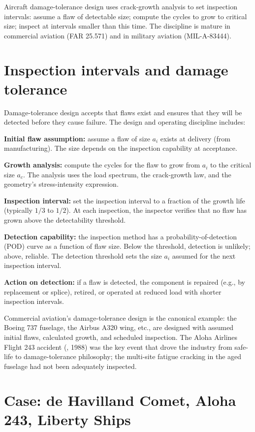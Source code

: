 Aircraft damage-tolerance design uses crack-growth analysis to set inspection intervals: assume a flaw of detectable size; compute the cycles to grow to critical size; inspect at intervals smaller than this time. The discipline is mature in commercial aviation (FAR 25.571) and in military aviation (MIL-A-83444).

\section{Inspection intervals and damage tolerance}

Damage-tolerance design accepts that flaws exist and ensures that they will be detected before they cause failure. The design and operating discipline includes:

\textbf{Initial flaw assumption:} assume a flaw of size $a_i$ exists at delivery (from manufacturing). The size depends on the inspection capability at acceptance.

\textbf{Growth analysis:} compute the cycles for the flaw to grow from $a_i$ to the critical size $a_c$. The analysis uses the load spectrum, the crack-growth law, and the geometry's stress-intensity expression.

\textbf{Inspection interval:} set the inspection interval to a fraction of the growth life (typically $1/3$ to $1/2$). At each inspection, the inspector verifies that no flaw has grown above the detectability threshold.

\textbf{Detection capability:} the inspection method has a probability-of-detection (POD) curve as a function of flaw size. Below the threshold, detection is unlikely; above, reliable. The detection threshold sets the size $a_i$ assumed for the next inspection interval.

\textbf{Action on detection:} if a flaw is detected, the component is repaired (e.g., by replacement or splice), retired, or operated at reduced load with shorter inspection intervals.

Commercial aviation's damage-tolerance design is the canonical example: the Boeing 737 fuselage, the Airbus A320 wing, etc., are designed with assumed initial flaws, calculated growth, and scheduled inspection. The Aloha Airlines Flight 243 accident (\cite{acc:ntsb-aar94-04}, 1988) was the key event that drove the industry from safe-life to damage-tolerance philosophy; the multi-site fatigue cracking in the aged fuselage had not been adequately inspected.

\section{Case: de Havilland Comet, Aloha 243, Liberty Ships}

